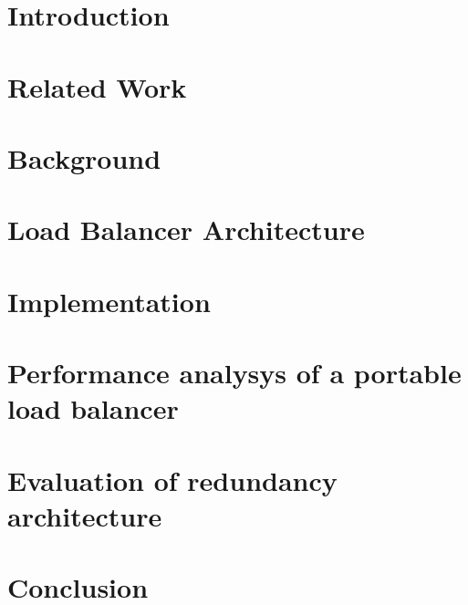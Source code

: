 
\chapter{Introduction}\label{chapter:introduction}
\graphicspath{{Manuscript/}}


\chapter{Related Work}\label{chapter:related}
\graphicspath{{Manuscript/}}


\chapter{Background}\label{chapter:background}
\graphicspath{{Manuscript/}}


\chapter{Load Balancer Architecture}\label{chapter:architecture}
\graphicspath{{Manuscript/}}


\chapter{Implementation}\label{chapter:implemetation}
\graphicspath{{Manuscript/}}


\chapter{Performance analysys of a portable load balancer}\label{chapter:evaluation}
\graphicspath{{Manuscript/}}


\chapter{Evaluation of redundancy architecture}\label{chapter:evaluation}
\graphicspath{{Manuscript/}}


\chapter{Conclusion}\label{chapter:conclusion}
\graphicspath{{Manuscript/}}


